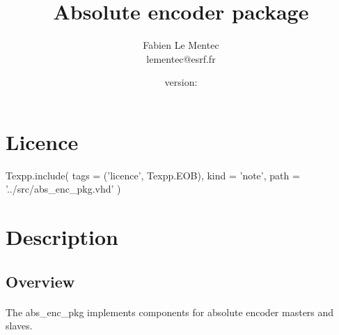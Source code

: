 \documentclass[12pt]{article}
\begin{document}

\newcommand{\todo}[1]
{\paragraph{}\textbf{TODO}: #1}

{\lstset{language=VHDL, basicstyle=\tiny, frame=single}}{}

{\lstset{frame=single}}{}

\newcommand{\longurl}[2]
{\url{#1#2}}

\newcommand{\longlongurl}[3]
{\url{#1#2#3}}

{}{\newcommand{\version}{none}}





\title{Absolute encoder package}
\author{Fabien Le Mentec \\ lementec@esrf.fr}
\date{\small{version: \version}}
\maketitle


\newpage
\setcounter{tocdepth}{2}
\tableofcontents


\newpage
\section{Licence}
\begin{texpp}
Texpp.include(
 tags = ('licence', Texpp.EOB),
 kind = 'note',
 path = '../src/abs_enc_pkg.vhd'
)
\end{texpp}


\newpage
\section{Description}

\subsection{Overview}
\paragraph{}
The abs\_enc\_pkg implements components for absolute encoder masters and
slaves.
\end{document}
